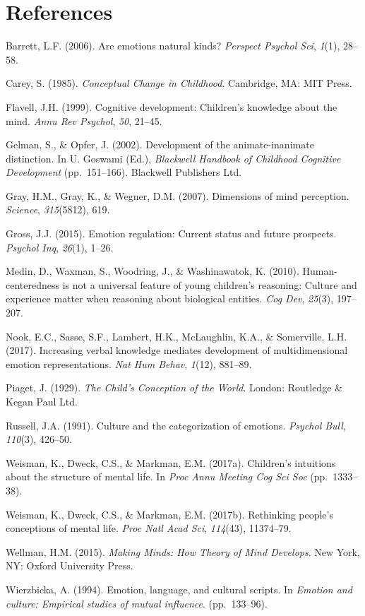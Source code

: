 \documentclass[10pt, letterpaper]{article}
\begin{document}
\section{References}\label{references}

Barrett, L.F. (2006). Are emotions natural kinds? \emph{Perspect Psychol
Sci}, \emph{1}(1), 28--58.

Carey, S. (1985). \emph{Conceptual Change in Childhood}. Cambridge, MA:
MIT Press.

Flavell, J.H. (1999). Cognitive development: Children's knowledge about
the mind. \emph{Annu Rev Psychol}, \emph{50}, 21--45.

Gelman, S., \& Opfer, J. (2002). Development of the animate-inanimate
distinction. In U. Goswami (Ed.), \emph{Blackwell Handbook of Childhood
Cognitive Development} (pp.~151--166). Blackwell Publishers Ltd.

Gray, H.M., Gray, K., \& Wegner, D.M. (2007). Dimensions of mind
perception. \emph{Science}, \emph{315}(5812), 619.

Gross, J.J. (2015). Emotion regulation: Current status and future
prospects. \emph{Psychol Inq}, \emph{26}(1), 1--26.

Medin, D., Waxman, S., Woodring, J., \& Washinawatok, K. (2010).
Human-centeredness is not a universal feature of young children's
reasoning: Culture and experience matter when reasoning about biological
entities. \emph{Cog Dev}, \emph{25}(3), 197--207.

Nook, E.C., Sasse, S.F., Lambert, H.K., McLaughlin, K.A., \& Somerville,
L.H. (2017). Increasing verbal knowledge mediates development of
multidimensional emotion representations. \emph{Nat Hum Behav},
\emph{1}(12), 881--89.

Piaget, J. (1929). \emph{The Child's Conception of the World}. London:
Routledge \& Kegan Paul Ltd.

Russell, J.A. (1991). Culture and the categorization of emotions.
\emph{Psychol Bull}, \emph{110}(3), 426--50.

Weisman, K., Dweck, C.S., \& Markman, E.M. (2017a). Children's
intuitions about the structure of mental life. In \emph{Proc Annu
Meeting Cog Sci Soc} (pp.~1333--38).

Weisman, K., Dweck, C.S., \& Markman, E.M. (2017b). Rethinking people's
conceptions of mental life. \emph{Proc Natl Acad Sci}, \emph{114}(43),
11374--79.

Wellman, H.M. (2015). \emph{Making Minds: How Theory of Mind Develops}.
New York, NY: Oxford University Press.

Wierzbicka, A. (1994). Emotion, language, and cultural scripts. In
\emph{Emotion and culture: Empirical studies of mutual influence}.
(pp.~133--96).

\setlength{\parindent}{-0.1in} \setlength{\leftskip}{0.125in} \noindent
\end{document}
